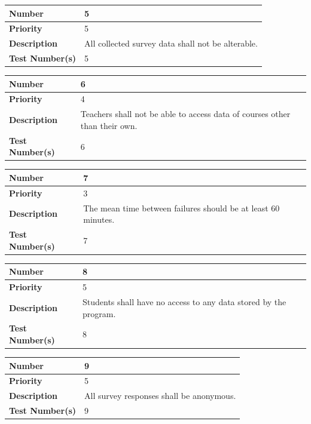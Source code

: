 \documentclass{article}
\begin{document}
\begin{center}
\bigskip
{}
\begin{tabular}{|p{3.5cm}|p{7.5cm}|} 
\hline
\textbf{Number} & 5  \\
\hline
\textbf{Priority} & 5\\ 
\hline
\textbf{Description} & All collected survey data shall not be alterable.\\ 
\hline
\textbf{Test Number(s) }& 5 \\ 
\hline
\end{tabular}


\bigskip
{}
\begin{tabular}{|p{3.5cm}|p{7.5cm}|} 
\hline
\textbf{Number} & 6  \\
\hline
\textbf{Priority} & 4\\ 
\hline
\textbf{Description} & Teachers shall not be able to access data of courses other than their own. \\ 
\hline
\textbf{Test Number(s) }& 6 \\ 
\hline
\end{tabular}


\bigskip
{}
\begin{tabular}{|p{3.5cm}|p{7.5cm}|} 
\hline
\textbf{Number} & 7  \\
\hline
\textbf{Priority} & 3\\ 
\hline
\textbf{Description} & The mean time between failures should be at least 60 minutes. \\ 
\hline
\textbf{Test Number(s) }& 7 \\ 
\hline
\end{tabular}


\bigskip
{}
\begin{tabular}{|p{3.5cm}|p{7.5cm}|} 
\hline
\textbf{Number} & 8  \\
\hline
\textbf{Priority} & 5\\ 
\hline
\textbf{Description} & Students shall have no access to any data stored by the program. \\ 
\hline
\textbf{Test Number(s) }& 8 \\ 
\hline
\end{tabular}


\bigskip
{}
\begin{tabular}{|p{3.5cm}|p{7.5cm}|} 
\hline
\textbf{Number} & 9  \\
\hline
\textbf{Priority} & 5 \\ 
\hline
\textbf{Description} & All survey responses shall be anonymous. \\ 
\hline
\textbf{Test Number(s) }& 9 \\ 
\hline
\end{tabular}



\end{center}
\end{document}
